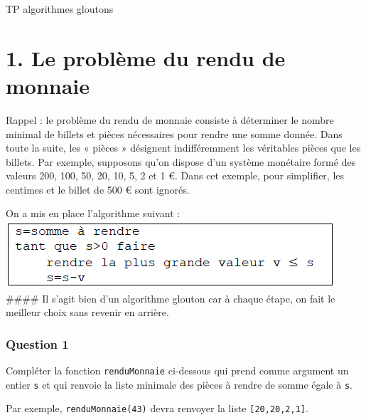 \documentclass[
  paper=a4,
  ,captions=tableheading
]{scrartcl}
\author{}
\date{}
\title{}
\author{}
\date{}
\begin{document}




TP algorithmes gloutons

\hypertarget{1-le-probluxe8me-du-rendu-de-monnaie}{%
\section{1. Le problème du rendu de
monnaie}\label{1-le-probluxe8me-du-rendu-de-monnaie}}

Rappel : le problème du rendu de monnaie consiste à déterminer le nombre
minimal de billets et pièces nécessaires pour rendre une somme donnée.
Dans toute la suite, les « pièces » désignent indifféremment les
véritables pièces que les billets. Par exemple, supposons qu'on dispose
d'un système monétaire formé des valeurs 200, 100, 50, 20, 10, 5, 2 et 1
€. Dans cet exemple, pour simplifier, les centimes et le billet de 500 €
sont ignorés.

On a mis en place l'algorithme suivant :
\includegraphics{images/1-image.png} \#\#\#\# Il s'agit bien d'un
algorithme glouton car à chaque étape, on fait le meilleur choix sans
revenir en arrière.

\hypertarget{question-1}{%
\subsubsection{Question 1}\label{question-1}}

Compléter la fonction \texttt{renduMonnaie} ci-dessous qui prend comme
argument un entier \texttt{s} et qui renvoie la liste minimale des
pièces à rendre de somme égale à \texttt{s}.

Par exemple, \texttt{renduMonnaie(43)} devra renvoyer la liste
\texttt{{[}20,20,2,1{]}}.
\end{document}
